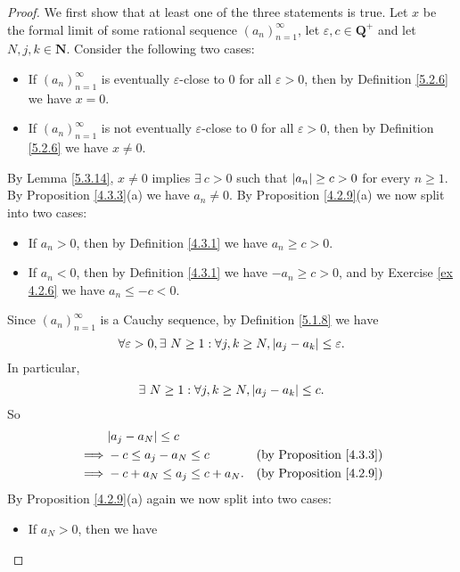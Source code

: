 \begin{proof}
    We first show that at least one of the three statements is true.
    Let \(x\) be the formal limit of some rational sequence \((a_n)_{n = 1}^{\infty}\), let \(\varepsilon, c \in \mathbf{Q}^+\) and let \(N, j, k \in \mathbf{N}\).
    Consider the following two cases:
    \begin{itemize}
        \item If \((a_n)_{n = 1}^{\infty}\) is eventually \(\varepsilon\)-close to \(0\) for all \(\varepsilon > 0\), then by Definition \ref{5.2.6} we have \(x = 0\).
        \item If \((a_n)_{n = 1}^{\infty}\) is not eventually \(\varepsilon\)-close to \(0\) for all \(\varepsilon > 0\), then by Definition \ref{5.2.6} we have \(x \neq 0\).
    \end{itemize}
    By Lemma \ref{5.3.14}, \(x \neq 0\) implies \(\exists\ c > 0\) such that \(\abs*{a_n} \geq c > 0\) for every \(n \geq 1\).
    By Proposition \ref{4.3.3}(a) we have \(a_n \neq 0\).
    By Proposition \ref{4.2.9}(a) we now split into two cases:
    \begin{itemize}
        \item If \(a_n > 0\), then by Definition \ref{4.3.1} we have \(a_n \geq c > 0\).
        \item If \(a_n < 0\), then by Definition \ref{4.3.1} we have \(-a_n \geq c > 0\), and by Exercise \ref{ex 4.2.6} we have \(a_n \leq -c < 0\).
    \end{itemize}
    Since \((a_n)_{n = 1}^{\infty}\) is a Cauchy sequence, by Definition \ref{5.1.8} we have
    \[
        \forall \varepsilon > 0, \exists\ N \geq 1 : \forall j, k \geq N, \abs*{a_j - a_k} \leq \varepsilon.
    \]
    In particular,
    \[
        \exists\ N \geq 1 : \forall j, k \geq N, \abs*{a_j - a_k} \leq c.
    \]
    So
    \begin{align*}
                 & \abs*{a_j - a_N} \leq c                                               \\
        \implies & -c \leq a_j - a_N \leq c        & \text{(by Proposition \ref{4.3.3})} \\
        \implies & -c + a_N \leq a_j \leq c + a_N. & \text{(by Proposition \ref{4.2.9})} \\
    \end{align*}
    By Proposition \ref{4.2.9}(a) again we now split into two cases:
    \begin{itemize}
        \item If \(a_N > 0\), then we have

\end{itemize}
\end{proof}

